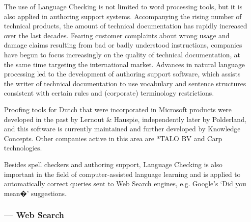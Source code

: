 \documentclass{scrartcl}
\begin{document}
\begin{Parallel}[c]{70mm}{70mm}
{    The use of Language Checking is not limited to word processing tools, but it is also applied in authoring support systems. Accompanying the rising number of technical products, the amount of technical documentation has rapidly increased over the last decades. Fearing customer complaints about wrong usage and damage claims resulting from bad or badly understood instructions, companies have begun to focus increasingly on the quality of technical documentation, at the same time targeting the international market. Advances in natural language processing led to the development of authoring support software, which assists the writer of technical documentation to use vocabulary and sentence structures consistent with certain rules and (corporate) terminology restrictions.

    Proofing tools for Dutch that were incorporated in Microsoft products were developed in the past by Lernout \& Hauspie, independently later by Polderland, and this software is currently maintained and further developed by Knowledge Concepts.  Other companies active in this area are *TAL{\=O} BV and Carp technologies.

    Besides spell checkers and authoring support, Language Checking is also important in the field of computer-assisted language learning and is applied to automatically correct queries sent to Web Search engines, e.g. Google's `Did you mean�' suggestions.

  }
  \ParallelPar


  \subsubsection{ --- Web Search}

  \MyParallelLText{
   

  }

\end{Parallel}
\end{document}
